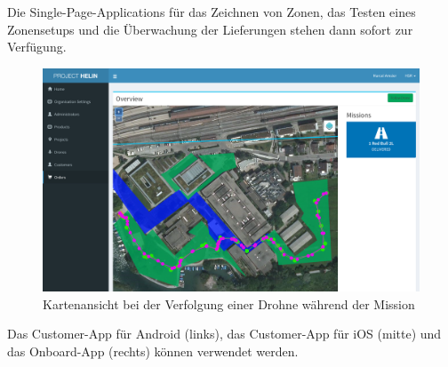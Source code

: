 Die \Gls{Single-Page-Applications} für das Zeichnen von Zonen, das Testen eines Zonensetups und die Überwachung der Lieferungen stehen dann sofort zur Verfügung.

\begin{figure}[H]
	\centering
	\includegraphics[width=1.0\textwidth] {images/map-ui.png}
	\caption{Kartenansicht bei der Verfolgung einer Drohne während der Mission}
\end{figure}

\newpage
Das Customer-App für Android (links), das Customer-App für iOS (mitte) und das Onboard-App (rechts) können verwendet werden.


